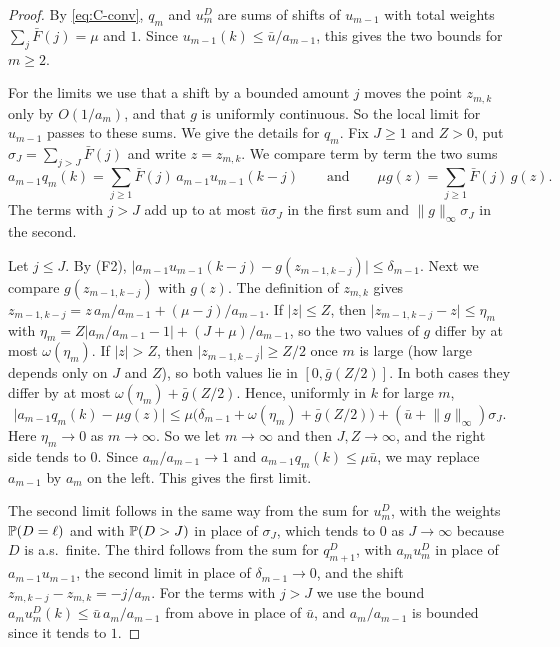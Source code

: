 \begin{proof}
By \eqref{eq:C-conv}, $q_m$ and $u^D_m$ are sums of shifts of $u_{m-1}$ with total
weights $\sum_j\bar F(j)=\mu$ and $1$. Since $u_{m-1}(k)\le\bar u/a_{m-1}$, this gives the
two bounds for $m\ge2$.

For the limits we use that a shift by a bounded amount $j$ moves the point $z_{m,k}$ only
by $O(1/a_m)$, and that $g$ is uniformly continuous. So the local limit for $u_{m-1}$
passes to these sums. We give the details for $q_m$. Fix $J\ge1$ and $Z>0$, put
$\sigma_J=\sum_{j>J}\bar F(j)$ and write $z=z_{m,k}$. We compare term by term the two sums
\[
a_{m-1}q_m(k)=\sum_{j\ge1}\bar F(j)\,a_{m-1}u_{m-1}(k-j)\qquad\text{and}\qquad
\mu g(z)=\sum_{j\ge1}\bar F(j)\,g(z).
\]
The terms with $j>J$ add up to at most $\bar u\sigma_J$ in the first sum and
$\lVert g\rVert_\infty\sigma_J$ in the second.

Let $j\le J$. By (F2),
$\lvert a_{m-1}u_{m-1}(k-j)-g(z_{m-1,k-j})\rvert\le\delta_{m-1}$. Next we compare
$g(z_{m-1,k-j})$ with $g(z)$. The definition of $z_{m,k}$ gives
$z_{m-1,k-j}=z\,a_m/a_{m-1}+(\mu-j)/a_{m-1}$. If $\lvert z\rvert\le Z$, then
$\lvert z_{m-1,k-j}-z\rvert\le\eta_m$ with
$\eta_m=Z\lvert a_m/a_{m-1}-1\rvert+(J+\mu)/a_{m-1}$, so the two values of $g$ differ by
at most $\omega(\eta_m)$. If $\lvert z\rvert>Z$, then
$\lvert z_{m-1,k-j}\rvert\ge Z/2$ once $m$ is large (how large depends only on $J$ and
$Z$), so both values lie in $[0,\bar g(Z/2)]$. In both cases they differ by at most
$\omega(\eta_m)+\bar g(Z/2)$. Hence, uniformly in $k$ for large $m$,
\[
\bigl\lvert a_{m-1}q_m(k)-\mu g(z)\bigr\rvert
\le\mu\bigl(\delta_{m-1}+\omega(\eta_m)+\bar g(Z/2)\bigr)
+(\bar u+\lVert g\rVert_\infty)\sigma_J .
\]
Here $\eta_m\to0$ as $m\to\infty$. So we let $m\to\infty$ and then $J,Z\to\infty$, and
the right side tends to $0$. Since $a_m/a_{m-1}\to1$ and $a_{m-1}q_m(k)\le\mu\bar u$, we
may replace $a_{m-1}$ by $a_m$ on the left. This gives the first limit.

The second limit follows in the same way from the sum for $u^D_m$, with the weights
$\mathbb{P}(D=\ell)$ and with $\mathbb{P}(D>J)$ in place of $\sigma_J$, which tends to $0$ as
$J\to\infty$ because $D$ is a.s.\ finite. The third follows from the sum for $q^D_{m+1}$, with
$a_mu^D_m$ in place of $a_{m-1}u_{m-1}$, the second limit in place of $\delta_{m-1}\to0$,
and the shift $z_{m,k-j}-z_{m,k}=-j/a_m$. For the terms with $j>J$ we use the bound
$a_mu^D_m(k)\le\bar u\,a_m/a_{m-1}$ from above in place of $\bar u$, and $a_m/a_{m-1}$ is
bounded since it tends to $1$.
\end{proof}


